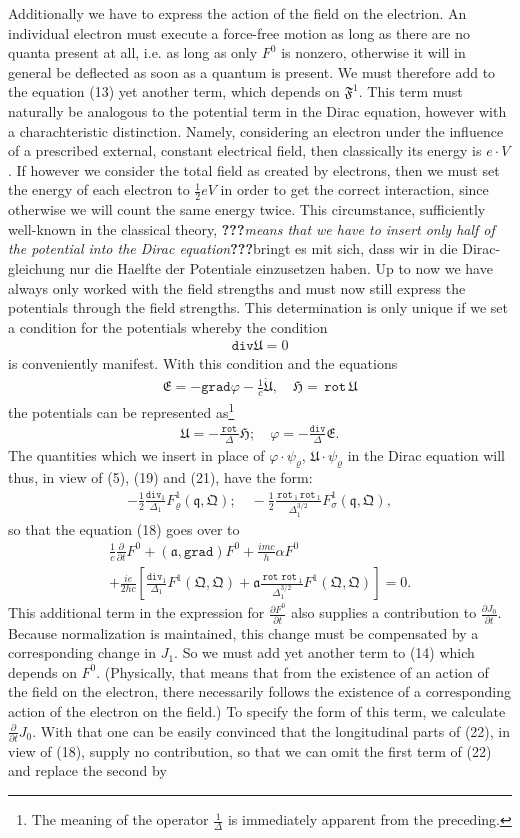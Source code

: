 \documentclass[a4paper,11pt]{article}
\newcommand{\WTF}[1]{\textbf{???}\textit{#1}\textbf{???}}
\newcommand{\?}[2]{#1\footnote{\textsc{Translator note}: #2}}
\newcommand{\nequ}[2]{\begin{align*}\tag{#1}#2\end{align*}}
\newcommand{\uequ}[1]{\begin{align*}#1\end{align*}}
\renewcommand{\operatorfont}[1]{\texttt{#1}}
\newcommand{\grad}{\operatorfont{grad}}
\renewcommand{\div}{\operatorfont{div}}
\newcommand{\rot}{\,\operatorfont{rot}\,}
\newcommand{\pXpY}[2]{\frac{\partial #1}{\partial #2}}
\newcommand{\mf}[1]{\mathfrak{#1}}
\begin{document}
Additionally we have to express the action of the field on the electrion. An individual electron must execute a force-free motion as long as there are no quanta present at all, i.e. as long as only $F^0$ is nonzero, otherwise it will in general be deflected as soon as a quantum is present. We must therefore add to the equation (13) yet another term, which depends on $\mf{F}^1$. This term must naturally be analogous to the potential term in the Dirac equation, however with a charachteristic distinction. Namely, considering an electron under the influence of a prescribed external, constant electrical field, then classically its energy is $e\cdot V$. If however we consider the total field as created by electrons, then we must set the energy of each electron to $\frac{1}{2} eV$ in order to get the correct interaction, since otherwise we will count the same energy twice. This circumstance, sufficiently well-known in the classical theory, \WTF{means that we have to insert only half of the potential into the Dirac equation}{bringt es mit sich, dass wir in die Dirac-gleichung nur die Haelfte der Potentiale einzusetzen haben}. Up to now we have always only worked with the field strengths and must now still express the potentials through the field strengths. This determination is only unique if we set a condition for the potentials whereby the condition
\nequ{30}{
\div\mf{U} = 0
}
is conveniently manifest. With this condition and the equations
\uequ{
\mf{E} = -\grad\varphi - \frac{1}{c}\dot{\mf{U}},\quad
\mf{H} = \rot\mf{U}
}
the potentials can be represented as\footnote{The meaning of the operator $\frac{1}{\Delta}$ is immediately apparent from the preceding.}
\nequ{21}{
\mf{U} = -\frac{\rot}{\Delta}\mf{H};\quad\varphi = -\frac{\div}{\Delta}\mf{E}.
}
The quantities which we insert in place of $\varphi\cdot\psi_\varrho$, $\mf{U}\cdot\psi_\varrho$ in the Dirac equation will thus, in view of (5), (19) and (21), have the form:
\nequ{22}{
-\frac{1}{2}\frac{\div_1}{\Delta_1}F_\varrho^1(\mf{q},\mf{Q}); \quad
-\frac{1}{2}\frac{\rot_1\rot_1}{\Delta_1^{3/2}}F_\sigma^1(\mf{q},\mf{Q}),
}
so that the equation (18) goes over to
\nequ{23}{
\frac{1}{c}\pXpY{}{t}F^0 + (\mf{a},\grad)F^0 + \frac{imc}{h}\alpha F^0\\
+ \frac{ie}{2hc}\left[
\frac{\div_1}{\Delta_1}F^1(\mf{Q},\mf{Q}) + 
\mf{a}\frac{\rot\rot_1}{\Delta_1^{3/2}}F^1(\mf{Q},\mf{Q})
\right] = 0.
}
This additional term in the expression for $\pXpY{F^0}{t}$ also supplies a contribution to $\pXpY{J_0}{t}$. Because normalization is maintained, this change must be compensated by a corresponding change in $J_1$. So we must add yet another term to (14) which depends on $F^0$. (Physically, that means that from the existence of an action of the field on the electron, there necessarily follows the existence of a corresponding action of the electron on the field.) To specify the form of this term, we calculate $\pXpY{}{t}J_0$. With that one can be easily convinced that the longitudinal parts of (22), in view of (18), supply no contribution, so that we can omit the first term of (22) and replace the second by
\end{document}

